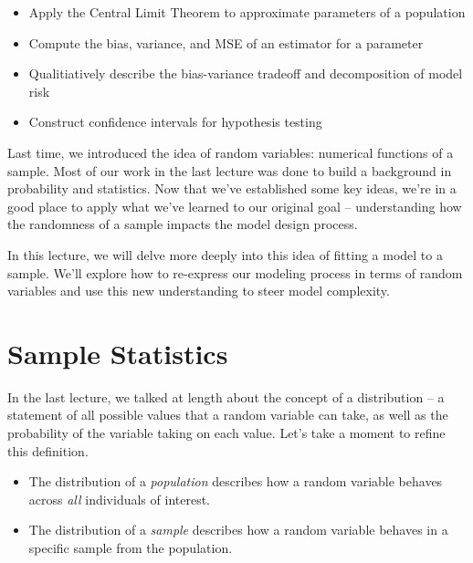 \documentclass[
  letterpaper,
  DIV=11,
  numbers=noendperiod]{scrreprt}
\providecommand{\tightlist}{%
  \setlength{\itemsep}{0pt}\setlength{\parskip}{0pt}}\usepackage{longtable,booktabs,array}
\begin{document}
\begin{tcolorbox}[enhanced jigsaw, breakable, colbacktitle=quarto-callout-note-color!10!white, colback=white, opacitybacktitle=0.6, opacityback=0, bottomrule=.15mm, titlerule=0mm, toptitle=1mm, bottomtitle=1mm, left=2mm, colframe=quarto-callout-note-color-frame, title=\textcolor{quarto-callout-note-color}{\faInfo}\hspace{0.5em}{Note}, rightrule=.15mm, toprule=.15mm, leftrule=.75mm, arc=.35mm, coltitle=black]

\begin{itemize}
\tightlist
\item
  Apply the Central Limit Theorem to approximate parameters of a
  population
\item
  Compute the bias, variance, and MSE of an estimator for a parameter
\item
  Qualitiatively describe the bias-variance tradeoff and decomposition
  of model risk
\item
  Construct confidence intervals for hypothesis testing
\end{itemize}

\end{tcolorbox}

Last time, we introduced the idea of random variables: numerical
functions of a sample. Most of our work in the last lecture was done to
build a background in probability and statistics. Now that we've
established some key ideas, we're in a good place to apply what we've
learned to our original goal -- understanding how the randomness of a
sample impacts the model design process.

In this lecture, we will delve more deeply into this idea of fitting a
model to a sample. We'll explore how to re-express our modeling process
in terms of random variables and use this new understanding to steer
model complexity.

\hypertarget{sample-statistics}{%
\section{Sample Statistics}\label{sample-statistics}}

In the last lecture, we talked at length about the concept of a
distribution -- a statement of all possible values that a random
variable can take, as well as the probability of the variable taking on
each value. Let's take a moment to refine this definition.

\begin{itemize}
\tightlist
\item
  The distribution of a \emph{population} describes how a random
  variable behaves across \emph{all} individuals of interest.
\item
  The distribution of a \emph{sample} describes how a random variable
  behaves in a specific sample from the population.
\end{itemize}
\end{document}
